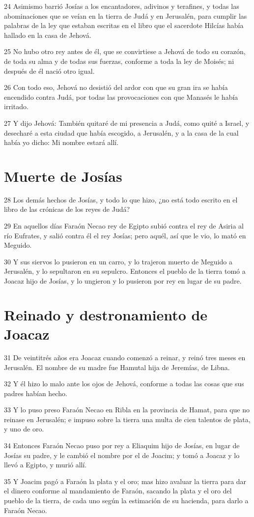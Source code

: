 \par 24 Asimismo barrió Josías a los encantadores, adivinos y terafines, y todas las abominaciones que se veían en la tierra de Judá y en Jerusalén, para cumplir las palabras de la ley que estaban escritas en el libro que el sacerdote Hilcías había hallado en la casa de Jehová.
\par 25 No hubo otro rey antes de él, que se convirtiese a Jehová de todo su corazón, de toda su alma y de todas sus fuerzas, conforme a toda la ley de Moisés; ni después de él nació otro igual.
\par 26 Con todo eso, Jehová no desistió del ardor con que su gran ira se había encendido contra Judá, por todas las provocaciones con que Manasés le había irritado.
\par 27 Y dijo Jehová: También quitaré de mi presencia a Judá, como quité a Israel, y desecharé a esta ciudad que había escogido, a Jerusalén, y a la casa de la cual había yo dicho: Mi nombre estará allí.

\section*{Muerte de Josías}

\par 28 Los demás hechos de Josías, y todo lo que hizo, ¿no está todo escrito en el libro de las crónicas de los reyes de Judá?
\par 29 En aquellos días Faraón Necao rey de Egipto subió contra el rey de Asiria al río Eufrates, y salió contra él el rey Josías; pero aquél, así que le vio, lo mató en Meguido.
\par 30 Y sus siervos lo pusieron en un carro, y lo trajeron muerto de Meguido a Jerusalén, y lo sepultaron en su sepulcro. Entonces el pueblo de la tierra tomó a Joacaz hijo de Josías, y lo ungieron y lo pusieron por rey en lugar de su padre.

\section*{Reinado y destronamiento de Joacaz}

\par 31 De veintitrés años era Joacaz cuando comenzó a reinar, y reinó tres meses en Jerusalén. El nombre de su madre fue Hamutal hija de Jeremías, de Libna.
\par 32 Y él hizo lo malo ante los ojos de Jehová, conforme a todas las cosas que sus padres habían hecho.
\par 33 Y lo puso preso Faraón Necao en Ribla en la provincia de Hamat, para que no reinase en Jerusalén; e impuso sobre la tierra una multa de cien talentos de plata,  y uno de oro.
\par 34 Entonces Faraón Necao puso por rey a Eliaquim hijo de Josías, en lugar de Josías su padre, y le cambió el nombre por el de Joacim; y tomó a Joacaz y lo llevó a Egipto, y murió allí. 
\par 35 Y Joacim pagó a Faraón la plata y el oro; mas hizo avaluar la tierra para dar el dinero conforme al mandamiento de Faraón, sacando la plata y el oro del pueblo de la tierra, de cada uno según la estimación de su hacienda, para darlo a Faraón Necao.

